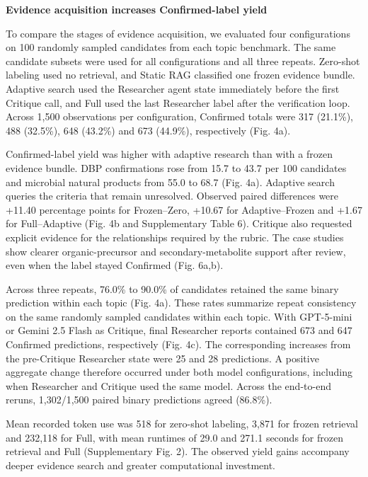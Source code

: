 \documentclass[
]{article}
\begin{document}
\vspace*{\fill}
\restoregeometry

\textbf{Evidence acquisition increases Confirmed-label yield}

To compare the stages of evidence acquisition, we evaluated four configurations on 100 randomly sampled candidates from each topic benchmark. The same candidate subsets were used for all configurations and all three repeats. Zero-shot labeling used no retrieval, and Static RAG classified one frozen evidence bundle. Adaptive search used the Researcher agent state immediately before the first Critique call, and Full used the last Researcher label after the verification loop. Across 1,500 observations per configuration, Confirmed totals were 317 (21.1\%), 488 (32.5\%), 648 (43.2\%) and 673 (44.9\%), respectively (Fig. 4a).

Confirmed-label yield was higher with adaptive research than with a frozen evidence bundle. DBP confirmations rose from 15.7 to 43.7 per 100 candidates and microbial natural products from 55.0 to 68.7 (Fig. 4a). Adaptive search queries the criteria that remain unresolved. Observed paired differences were +11.40 percentage points for Frozen--Zero, +10.67 for Adaptive--Frozen and +1.67 for Full--Adaptive (Fig. 4b and Supplementary Table 6). Critique also requested explicit evidence for the relationships required by the rubric. The case studies show clearer organic-precursor and secondary-metabolite support after review, even when the label stayed Confirmed (Fig. 6a,b).

Across three repeats, 76.0\% to 90.0\% of candidates retained the same binary prediction within each topic (Fig. 4a). These rates summarize repeat consistency on the same randomly sampled candidates within each topic. With GPT-5-mini or Gemini 2.5 Flash as Critique, final Researcher reports contained 673 and 647 Confirmed predictions, respectively (Fig. 4c). The corresponding increases from the pre-Critique Researcher state were 25 and 28 predictions. A positive aggregate change therefore occurred under both model configurations, including when Researcher and Critique used the same model. Across the end-to-end reruns, 1,302/1,500 paired binary predictions agreed (86.8\%).

Mean recorded token use was 518 for zero-shot labeling, 3,871 for frozen retrieval and 232,118 for Full, with mean runtimes of 29.0 and 271.1 seconds for frozen retrieval and Full (Supplementary Fig. 2). The observed yield gains accompany deeper evidence search and greater computational investment.
\end{document}
